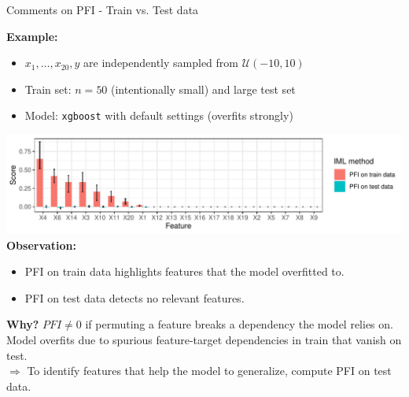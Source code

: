 \documentclass[10pt,compress,t,notes=noshow, xcolor=table]{beamer}
\begin{document}
\begin{frame}{Comments on PFI - Train vs. Test data}

\textbf{Example:} %

\begin{itemize}
  \item $x_1, \dots, x_{20}, y$ are independently sampled from $\mathcal{U} (-10, 10)$
  \item Train set: $n = 50$ (intentionally small) and large test set
  \item Model: \texttt{xgboost} with default settings (overfits strongly)
\end{itemize}

  \includegraphics[width=0.9\linewidth]{figure_man/pfi_test_vs_train.pdf}\\
\textbf{Observation:} 
\begin{itemize}
    \item PFI on train data highlights features that the model overfitted to.
    \item PFI on test data detects no relevant features.
\end{itemize} 
\pause
\medskip

\textbf{Why?} $PFI \neq 0$ if permuting a feature breaks a dependency the model relies on. 
Model overfits due to spurious feature-target dependencies in train that vanish on test.\\
$\Rightarrow$ To identify features that help the model to generalize, compute PFI on test data.
  
\end{frame}
\end{document}
